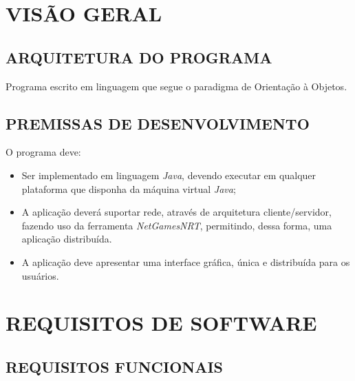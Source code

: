 \documentclass[12pt,a4paper,brazil,abntex2]{article}
\begin{document}
\newpage

\section{\normalsize VISÃO GERAL}
	\subsection{\normalsize ARQUITETURA DO PROGRAMA}

		Programa escrito em linguagem que segue o paradigma de Orientação à Objetos.
	
	\subsection{\normalsize PREMISSAS DE DESENVOLVIMENTO}
		
		O programa deve:		
		\begin{itemize}
			\item Ser implementado em linguagem \textit{Java}, devendo executar em qualquer plataforma que disponha da máquina virtual \textit{Java};
			\item A aplicação deverá suportar rede, através de arquitetura cliente/servidor, fazendo uso da ferramenta \textit{NetGamesNRT}, permitindo, dessa forma, uma aplicação distribuída.
			\item A aplicação deve apresentar uma interface gráfica, única e distribuída para os usuários.
		\end{itemize}
\newpage

\section{\normalsize REQUISITOS DE SOFTWARE}
	\subsection{\normalsize REQUISITOS FUNCIONAIS}
		
\end{document}
